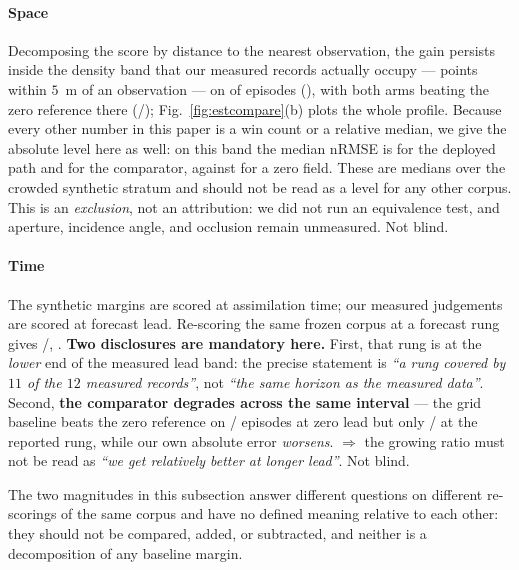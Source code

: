 \documentclass[review]{elsarticle}
\begin{document}
\paragraph{Space}
Decomposing the score by distance to the nearest observation, the gain persists
inside the density band that our measured records actually occupy --- points within
$5$~m of an observation --- on \MTenBetter{} of \MTenN{} episodes
(\MTenRel{}), with both arms beating the zero reference there
(\MTenCmp{}/\MTenN{}); Fig.~\ref{fig:estcompare}(b) plots the whole profile.
Because every other number in this paper is a win count or a relative median, we
give the absolute level here as well: on this band the median nRMSE is
\MTenAbsShip{} for the deployed path and \MTenAbsSpec{} for the comparator, against
\MTenAbsZero{} for a zero field. These are medians over the crowded synthetic
stratum and should not be read as a level for any other corpus. This is an \emph{exclusion}, not an attribution: we
did not run an equivalence test, and aperture, incidence angle, and occlusion remain
unmeasured. Not blind.

\paragraph{Time}
The synthetic margins are scored at assimilation time; our measured judgements are
scored at forecast lead. Re-scoring the same frozen corpus at a forecast rung gives
\TFourBetter{}/\TFourN{}, \TFourRel{}.
\textbf{Two disclosures are mandatory here.} First, that rung is at the
\emph{lower} end of the measured lead band: the precise statement is \emph{``a rung
covered by $11$ of the $12$ measured records''}, not \emph{``the same horizon as the
measured data''}. Second, \textbf{the comparator degrades across the same interval}
--- the grid baseline beats the zero reference on \TFourCmpAtZero{}/\TFourN{}
episodes at zero lead but only \TFourCmp{}/\TFourN{} at the reported rung, while our
own absolute error \emph{worsens}. $\Rightarrow$ the growing ratio must not be read as
\emph{``we get relatively better at longer lead''}. Not blind.

The two magnitudes in this subsection answer different questions on different
re-scorings of the same corpus and have no defined meaning relative to each other:
they should not be compared, added, or subtracted, and neither is a decomposition of
any baseline margin.
\end{document}

